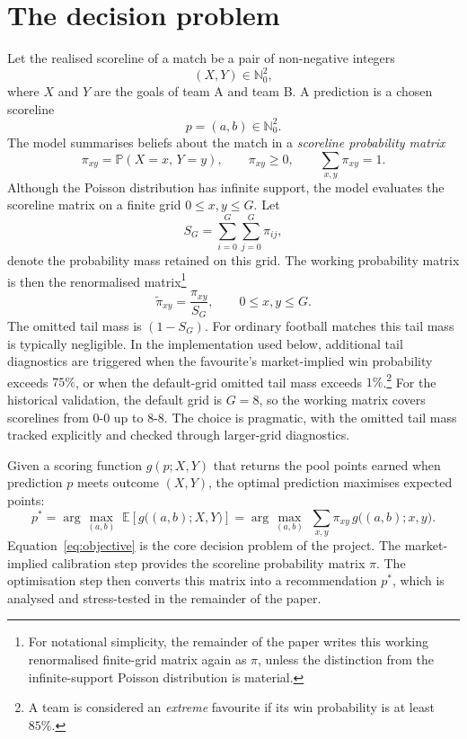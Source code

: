 \documentclass[11pt]{article}
\newcommand{\Prob}{\mathbb{P}}
\newcommand{\E}{\mathbb{E}}
\begin{document}
\section{The decision problem}

Let the realised scoreline of a match be a pair of non-negative integers
\[
(X,Y)\in\mathbb{N}_0^2,
\]
where $X$ and $Y$ are the goals of team A and team B. A prediction is a chosen scoreline
\[
p=(a,b)\in\mathbb{N}_0^2 .
\]
The model summarises beliefs about the match in a \emph{scoreline probability matrix}
\[
\pi_{xy}=\Prob(X=x,\,Y=y),\qquad \pi_{xy}\ge 0,\qquad \sum_{x,y}\pi_{xy}=1 .
\]
Although the Poisson distribution has infinite support, the model evaluates the scoreline matrix on a finite grid \(0 \leq x,y \leq G\). Let
\[
S_G
=
\sum_{i=0}^{G}\sum_{j=0}^{G} \pi_{ij},
\]
denote the probability mass retained on this grid. The working probability matrix is then the renormalised matrix\footnote{For notational simplicity, the remainder of the paper writes this working renormalised finite-grid matrix again as \(\pi\), unless the distinction from the infinite-support Poisson distribution is material.}
\[
\tilde{\pi}_{xy}
=
\frac{\pi_{xy}}{S_G},
\qquad
0 \leq x,y \leq G.
\]
The omitted tail mass is $(1-S_G)$. For ordinary football matches this tail mass is typically negligible. In the implementation used below, additional tail diagnostics are triggered when the favourite's market-implied win probability exceeds $75\%$, or when the default-grid omitted tail mass exceeds $1\%$.\footnote{A team is considered an \textit{extreme} favourite if its win probability is at least $85\%$.} For the historical validation, the default grid is \(G=8\), so the working matrix covers scorelines from \(0\)-\(0\) up to \(8\)-\(8\). The choice is pragmatic, with the omitted tail mass tracked explicitly and checked through larger-grid diagnostics.

Given a scoring function
$g(p;X,Y)$ that returns the pool points earned when prediction $p$ meets outcome
$(X,Y)$, the optimal prediction maximises expected points:
\begin{equation}
p^{*}
=\arg\max_{(a,b)}\;\E\!\left[g\big((a,b);X,Y\big)\right]
=\arg\max_{(a,b)}\;\sum_{x,y}\pi_{xy}\,g\big((a,b);x,y\big).
\label{eq:objective}
\end{equation}
Equation~\eqref{eq:objective} is the core decision problem of the project. The market-implied calibration step provides the scoreline probability matrix \(\pi\). The optimisation step then converts this matrix into a recommendation \(p^{*}\), which is analysed and stress-tested in the remainder of the paper.
\end{document}
